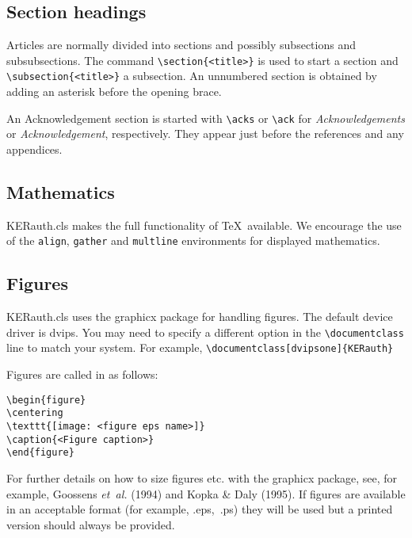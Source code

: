 \documentclass{KERauth}
\begin{document}
\subsection{Section headings}
Articles are normally divided into sections and possibly
subsections and subsubsections. The command
\verb"\section{<title>}" is used to start a section and
\verb"\subsection{<title>}" a subsection. An unnumbered section is
obtained by adding an asterisk before the opening brace.

An Acknowledgement section is started with \verb"\acks" or
\verb"\ack" for \textit{Acknowledgements} or
\textit{Acknowledgement}, respectively. They appear just before
the references and any appendices.

\subsection{Mathematics}
\textsf{KERauth.cls} makes the full functionality of \AmS\/\TeX\
available. We encourage the use of the \verb"align", \verb"gather"
and \verb"multline" environments for displayed mathematics.

\subsection{Figures}
\textsf{KERauth.cls} uses the \textsf{graphicx} package for handling
figures.  The default device driver is \textsf{dvips}. You may
need to specify a different option in the \verb"\documentclass"
line to match your system. For example,
\verb+\documentclass[dvipsone]{KERauth}+

Figures are called in as follows:
\begin{verbatim}
\begin{figure}
\centering
\texttt{[image: <figure eps name>]}
\caption{<Figure caption>}
\end{figure}
\end{verbatim}

For further details on how to size figures etc. with the
\textsf{graphicx} package, see, for example, Goossens
\emph{et~al.} (1994) and Kopka \& Daly (1995). If figures are
available in an acceptable format (for example, .eps,~.ps) they
will be used but a printed version should always be provided.
\end{document}
